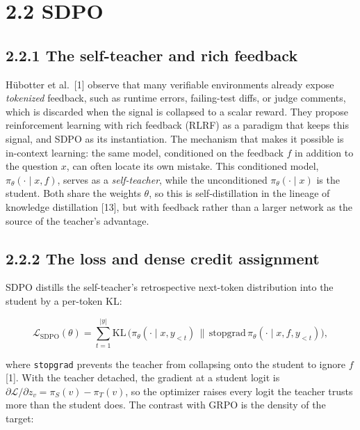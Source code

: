 \section{2.2 SDPO}\label{sdpo}

\subsection{2.2.1 The self-teacher and rich feedback}\label{the-self-teacher-and-rich-feedback}

Hübotter et al.~{[}1{]} observe that many verifiable environments already expose \emph{tokenized} feedback, such as runtime errors, failing-test diffs, or judge comments, which is discarded when the signal is collapsed to a scalar reward. They propose reinforcement learning with rich feedback (RLRF) as a paradigm that keeps this signal, and SDPO as its instantiation. The mechanism that makes it possible is in-context learning: the same model, conditioned on the feedback \(f\) in addition to the question \(x\), can often locate its own mistake. This conditioned model, \(\pi_\theta(\cdot \mid x, f)\), serves as a \emph{self-teacher}, while the unconditioned \(\pi_\theta(\cdot \mid x)\) is the student. Both share the weights \(\theta\), so this is self-distillation in the lineage of knowledge distillation {[}13{]}, but with feedback rather than a larger network as the source of the teacher's advantage.

\subsection{2.2.2 The loss and dense credit assignment}\label{the-loss-and-dense-credit-assignment}

SDPO distills the self-teacher's retrospective next-token distribution into the student by a per-token KL:

\[
\mathcal{L}_{\text{SDPO}}(\theta) = \sum_{t=1}^{|y|} \mathrm{KL}\,\Big(\pi_\theta(\cdot \mid x, y_{<t}) \,\big\|\, \mathrm{stopgrad}\,\pi_\theta(\cdot \mid x, f, y_{<t})\Big),
\]

where \passthrough{\lstinline!stopgrad!} prevents the teacher from collapsing onto the student to ignore \(f\) {[}1{]}. With the teacher detached, the gradient at a student logit is \(\partial\mathcal{L}/\partial z_v = \pi_S(v) - \pi_T(v)\), so the optimizer raises every logit the teacher trusts more than the student does. The contrast with GRPO is the density of the target:

